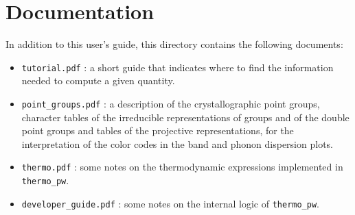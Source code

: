 \documentclass[12pt,a4paper]{article}
\begin{document}
\newpage
\section{\color{coral}Documentation}

In addition to this user's guide, this directory contains the following
documents:

\begin{itemize}

\item
\texttt{tutorial.pdf} : a short guide that indicates where to find the
information needed to compute a given quantity. 

\item
\texttt{point\_groups.pdf} : a description of the crystallographic point 
groups, character tables of the irreducible representations of groups and 
of the double point groups and tables of the projective representations, 
for the interpretation of the color codes in the band and phonon dispersion 
plots.

\item
\texttt{thermo.pdf} : some notes on the thermodynamic expressions implemented
in \texttt{thermo\_pw}.

\item
\texttt{developer\_guide.pdf} : some notes on the internal logic of
\texttt{thermo\_pw}.

\end{itemize}
\end{document}
